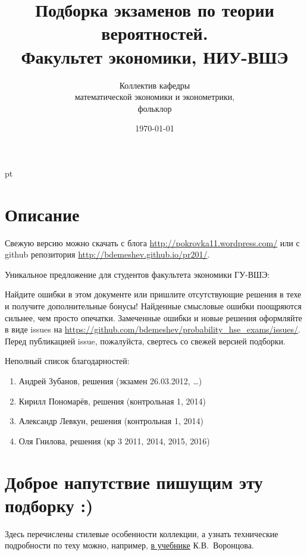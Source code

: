 \documentclass[12pt, a4paper]{article}\usepackage[]{graphicx}\usepackage[]{color}
\title{Подборка экзаменов по теории вероятностей. \\Факультет экономики, НИУ-ВШЭ}
\date{\today}
\author{Коллектив кафедры \\
математической экономики и эконометрики,\\
 фольклор}
\begin{document}
\maketitle

\tableofcontents{}


 pt %

\section{Описание}

Свежую версию можно скачать с блога \url{http://pokrovka11.wordpress.com/} или с github репозитория \url{http://bdemeshev.github.io/pr201/}.


Уникальное предложение для студентов факультета экономики ГУ-ВШЭ:


Найдите ошибки в этом документе или пришлите отсутствующие решения в техе и получите дополнительные бонусы! Найденные смысловые ошибки поощряются сильнее, чем просто опечатки. Замеченные ошибки и новые решения оформляйте в виде issues на \url{https://github.com/bdemeshev/probability_hse_exams/issues/}. Перед публикацией issue, пожалуйста, свертесь со свежей версией подборки.

Неполный список благодарностей:

\begin{enumerate}
\item Андрей Зубанов, решения (экзамен 26.03.2012, \ldots)
\item Кирилл Пономарёв, решения (контрольная 1, 2014)
\item Александр Левкун, решения (контрольная 1, 2014)
\item Оля Гнилова, решения (кр 3 2011, 2014, 2015, 2016)
\end{enumerate}


\section{Доброе напутствие пишущим эту подборку :)}

Здесь перечислены стилевые особенности коллекции, а узнать технические подробности по теху можно, например, \href{http://www.ccas.ru/voron/download/voron05latex.pdf}{в учебнике} К.В. Воронцова.
\end{document}
